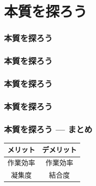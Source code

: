 \section{本質を探ろう}

\begin{frame}
    \frametitle{本質を探ろう}
\end{frame}

\begin{frame}
    \frametitle{本質を探ろう}
\end{frame}

\begin{frame}
    \frametitle{本質を探ろう}
\end{frame}

\begin{frame}
    \frametitle{本質を探ろう}
\end{frame}

\begin{frame}
    \frametitle{本質を探ろう --- まとめ}
    \begin{block}{}
        \centering
        \begin{tabular}{cc}
            \toprule
            メリット & デメリット \\
            \midrule
            作業効率 & 作業効率 \\
            凝集度 & 結合度 \\
            \bottomrule
        \end{tabular}
    \end{block}
\end{frame}

